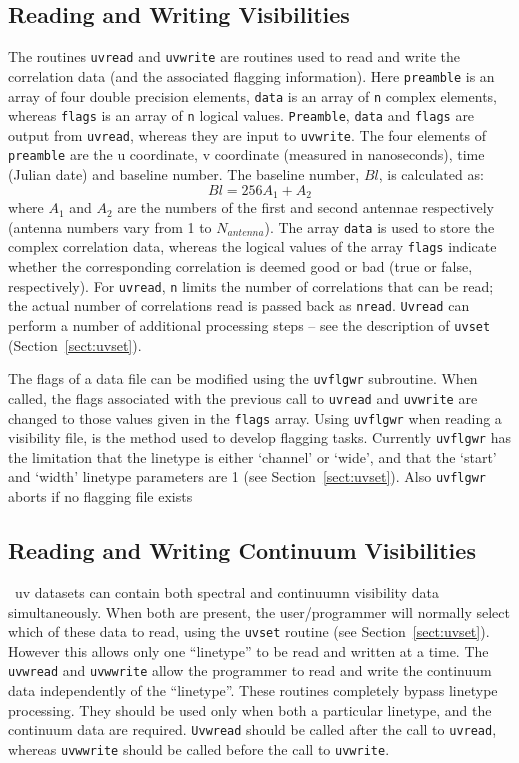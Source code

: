 \documentclass{report}
\begin{document}
\subsection{Reading and Writing Visibilities}
The routines {\tt uvread} and {\tt uvwrite} are routines used to read and
write the correlation data (and the associated flagging information).
Here {\tt preamble} is an array of four double precision elements, {\tt data}
is an array of {\tt n}
complex elements, whereas {\tt flags} is an array of {\tt n} logical values.
{\tt Preamble}, {\tt data} and {\tt flags} are output from {\tt uvread},
whereas they are input to {\tt uvwrite}. The four elements of
{\tt preamble} are the u coordinate, v coordinate (measured in nanoseconds),
time (Julian date) and baseline number. The baseline number, $Bl$, is
calculated  as:
\[
Bl = 256 A_1 + A_2
\]
where $A_1$ and $A_2$ are the numbers of the first and second antennae
respectively (antenna numbers vary from 1 to $N_{antenna}$). The array
{\tt data} is used to store the complex correlation data, whereas the logical
values of the array
{\tt flags} indicate whether the corresponding correlation is
deemed good or bad (true or false, respectively). For {\tt uvread}, {\tt n}
limits the number of correlations that can be read; the actual number of
correlations read is passed back as {\tt nread}. {\tt Uvread} can perform
a number of additional processing steps -- see the description of
{\tt uvset} (Section~\ref{sect:uvset}).

The flags of a data file can be modified using the {\tt uvflgwr} subroutine.
When called, the flags associated with the previous call to
{\tt uvread} and {\tt uvwrite} are changed to those values given in the
{\tt flags} array. Using {\tt uvflgwr} when reading a visibility file,
is the method used to develop flagging tasks. Currently {\tt uvflgwr}
has the limitation that the linetype is either `channel' or `wide', and that
the `start' and `width' linetype parameters are 1 (see
Section~\ref{sect:uvset}). Also {\tt uvflgwr}
aborts if no flagging file exists

\subsection{Reading and Writing Continuum Visibilities}
\miriad\ uv datasets can contain both spectral and continuumn visibility
data simultaneously. When both are present, the user/programmer will
normally select which of these data to read, using the {\tt uvset} routine
(see Section~\ref{sect:uvset}). However this allows only one ``linetype'' to be
read and written at a time. The {\tt uvwread} and {\tt uvwwrite} allow
the programmer to read and write the continuum data independently
of the ``linetype''. These routines completely bypass linetype processing.
They should be used only when both a particular linetype, and the continuum
data are required. {\tt Uvwread} should be called after the call to
{\tt uvread}, whereas {\tt uvwwrite} should be called before the call to
{\tt uvwrite}.
\end{document}
